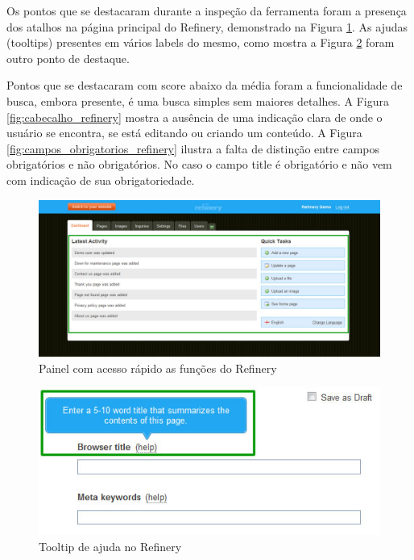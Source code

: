 Os pontos que se destacaram durante a inspeção da ferramenta foram a presença dos atalhos na página principal do Refinery, demonstrado na Figura \ref{fig:dashboard_refinery}. As ajudas (tooltips) presentes em vários labels do mesmo, como mostra a Figura \ref{fig:tooltip_refinery} foram outro ponto de destaque.

Pontos que se destacaram com score abaixo da média foram a funcionalidade de busca, embora presente, é uma busca simples sem maiores detalhes. A Figura \ref{fig:cabecalho_refinery} mostra a ausência de uma indicação clara de onde o usuário se encontra, se está editando ou criando um conteúdo. A Figura \ref{fig:campos_obrigatorios_refinery} ilustra a falta de distinção entre campos obrigatórios e não obrigatórios. No caso o campo title é obrigatório e não vem com indicação de sua obrigatoriedade.

\begin{figure}[here]
\includegraphics[width=150mm]{images/refinery_ponto_dashboard.jpg}
\caption{Painel com acesso rápido as funções do Refinery}
\label{fig:dashboard_refinery}
\end{figure}

\begin{figure}[here]
\includegraphics[width=150mm]{images/refinery_ponto_tooltip.jpg}
\caption{Tooltip de ajuda no Refinery}
\label{fig:tooltip_refinery}
\end{figure}


